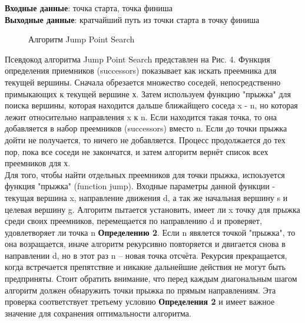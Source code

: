 \documentclass{physlab}
\begin{document}
\textbf{Входные данные}: точка старта, точка финиша\\
\textbf{Выходные данные}: кратчайший путь из точки старта в точку финиша
\begin{figure}[H]
\begin{minipage}[h]{0.55\linewidth}
\end{minipage}
\hfill
\begin{minipage}[h]{0.44\linewidth}
\end{minipage}
\caption{Алгоритм Jump Point Search}
\end{figure} 
Псевдокод алгоритма Jump Point Search представлен на Рис. 4.  Функция определения приемников (successors)  показывает как искать преемника для текущей вершины. Сначала обрезается множество соседей, непосредственно примыкающих к текущей вершине х. Затем используем функцию "прыжка"  для поиска вершины, которая находится дальше ближайщего соседа x - n, но которая лежит относительно направления x к n. Если находится такая точка, то она добавляется в набор преемников (successors) вместо n. Если до точки прыжка дойти не получается, то ничего не добавляется. Процесс продолжается до тех пор, пока все соседи не закончатся, и затем алгоритм вернёт список всех преемников для х. \\
Для того, чтобы найти отдельных преемников для точки прыжка, испоьзуется функция "прыжка" (function jump). Входные параметры данной функции - текущая вершина x, направление движения d, а так же начальная вершину s и целевая вершину g. Алгоритм пытается установить, имеет ли x точку для прыжка среди своих преемников, перемещается по направлению d  и проверяет, удовлетворяет ли точка n \textbf{Определению 2}. Если n явялется точкой "прыжка", то она возращается, иначе алгоритм рекурсивно повторяется и двигается снова в направлении d, но в этот раз n – новая точка отсчёта. Рекурсия прекращается, когда встречается препятствие и никакие дальнейшие действия не могут быть предприняты. Стоит обратить внимание, что перед каждым диагональным шагом алгоритм должен обнаружить точки прыжка по прямым направлениям. Эта проверка соответствует третьему условию \textbf{Определения 2} и имеет важное значение для сохранения оптимальности алгоритма.
\end{document}
